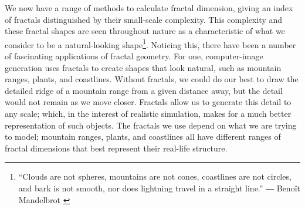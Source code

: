 \begin{exmp}
We now have a range of methods to calculate fractal dimension, giving an index of fractals distinguished by their small-scale complexity. 
This complexity and these fractal shapes are seen throughout nature as a characteristic of what we consider to be a natural-looking shape\footnote{“Clouds are not spheres, mountains are not cones, coastlines are not circles, and bark is not smooth, nor does lightning travel in a straight line.”
― Benoît Mandelbrot \cite{mandelbrot1983fractal}}.
Noticing this, there have been a number of fascinating applications of fractal geometry. For one, computer-image generation uses fractals to create shapes that look natural, such as mountain ranges, plants, and coastlines. Without fractals, we could do our best to draw the detailed ridge of a mountain range from a given distance away, but the detail would not remain as we move closer. Fractals allow us to generate this detail to any scale; which, in the interest of realistic simulation, makes for a much better representation of such objects. The fractals we use depend on what we are trying to model; mountain ranges, plants, and coastlines all have different ranges of fractal dimensions that best represent their real-life structure. \cite{Haeseler2012}
\end{exmp}


